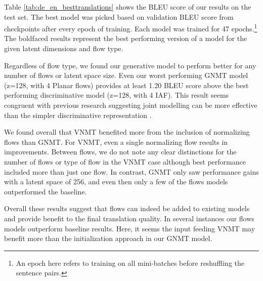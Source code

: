 Table \ref{tab:de_en_besttranslations} shows the BLEU score of our results on the test set. The best model was picked based on validation BLEU score from checkpoints after every epoch of training. Each model was trained for 47 epochs.\footnote{An epoch here refers to training on all mini-batches before reshuffling the sentence pairs.} The boldfaced results represent the best performing version of a model for the given latent dimensions and flow type.

Regardless of flow type, we found our generative model to perform better for any number of flows or latent space size. Even our worst performing \ac{GNMT} model (z=128, with 4 Planar flows) provides at least 1.20 BLEU score above the best performing discriminative model (z=128, with 4 \ac{IAF}). This result seems congruent with previous research suggesting joint modelling can be more effective than the simpler discriminative representation \cite{eikema2018AEVNMT}.

We found overall that \ac{VNMT} benefited more from the inclusion of normalizing flows than \ac{GNMT}. For \ac{VNMT}, even a single normalizing flow results in improvements. Between flows, we do not note any clear distinctions for the number of flows or type of flow in the \ac{VNMT} case although best performance included more than just one flow. In contrast, \ac{GNMT} only saw performance gains with a latent space of 256, and even then only a few of the flows models outperformed the baseline. 

Overall these results suggest that flows can indeed be added to existing models and provide benefit to the final translation quality. In several instances our flows models outperform baseline results. Here, it seems the input feeding \ac{VNMT} may benefit more than the initialization approach in our \ac{GNMT} model.





